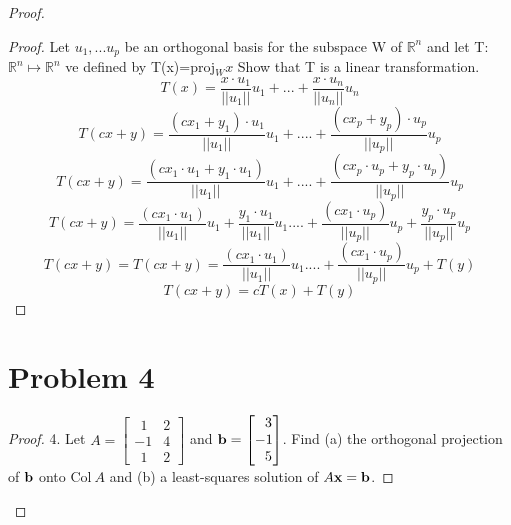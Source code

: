 \documentclass[12pt]{article}
\newcommand{\sect}[1]{\section*{#1}}
\newcommand{\R}{\mathbb{R}}
\begin{document}
\begin{proof}
\begin{proof}
    Let $u_1,...u_p$ be an orthogonal basis for the subspace W of $\R^n$ and let T: $
    \R^n \mapsto \R^n$ ve defined by T(x)=proj$_Wx$ Show that T is a linear transformation.
  \[
    T(x)=\frac{x\cdot u_1}{||u_1||}u_1+...+\frac{x\cdot u_n}{||u_n||}u_n
  \]
  \[
    T(cx+y)=\frac{(cx_1+y_1)\cdot u_1}{||u_1||}u_1+....+\frac{(cx_p+y_p)\cdot u_p}{||u_p||}u_p
  \]
  \[
    T(cx+y)=\frac{(cx_1\cdot u_1+y_1\cdot u_1)}{||u_1||}u_1+....+\frac{(cx_p\cdot u_p+y_p\cdot u_p)}{||u_p||}u_p
  \]
  \[
    T(cx+y)=\frac{(cx_1\cdot u_1)}{||u_1||}u_1+\frac{y_1\cdot u_1}{||u_1||}u_1....+\frac{(cx_1\cdot u_p)}{||u_p||}u_p+\frac{y_p\cdot u_p}{||u_p||}u_p
  \]
  \[
    T(cx+y)=  T(cx+y)=\frac{(cx_1\cdot u_1)}{||u_1||}u_1....+\frac{(cx_1\cdot u_p)}{||u_p||}u_p+T(y)
  \]
  \[
    T(cx+y)=cT(x)+T(y)
  \]
\end{proof}
\sect{Problem 4}
\begin{proof}
  4. Let $A = \begin{bmatrix}~~1 & 2\\-1 & 4\\~~1 & 2\end{bmatrix}$ and ${\bf b} = \begin{bmatrix} ~~3\\ -1\\~~5\end{bmatrix}$.
  Find (a) the orthogonal projection of ${\bf b}$ onto $\text{Col}~A$ and (b) a least-squares solution of
  $A{\bf x} = {\bf b}$.
  \vskip 10pt


\end{proof}
\end{proof}
\end{document}
